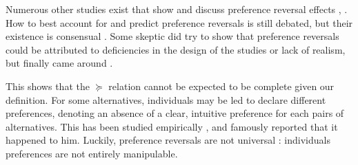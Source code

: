 \documentclass[french, english]{llncs}
\begin{document}
	
	Numerous other studies exist that show and discuss preference reversal effects \citep[Ch. 2]{deparis_etude_2012}, \citep{lichtenstein_construction_2006, tversky_causes_1990, kahneman_judgement_1981, kahneman_choices_2000}. How to best account for and predict preference reversals is still debated, but their existence is consensual \citep{wakker_prospect_2010, birnbaum_empirical_2017}. Some skeptic did try to show that preference reversals could be attributed to deficiencies in the design of the studies or lack of realism, but finally came around \citet{slovic_preference_1983}.
		
	This shows that the $\succeq$ relation cannot be expected to be complete given our definition. For some alternatives, individuals may be led to declare different preferences, denoting an absence of a clear, intuitive preference for each pairs of alternatives. This has been studied empirically \citep{slovic_who_1974, maccrimmon_utility_1979, lichtenstein_reversals_2006}, and \citet[pp. 101 – 103]{savage_foundations_1972} famously reported that it happened to him. Luckily, preference reversals are not universal \citep[p. xvi]{lichtenstein_construction_2006}: individuals preferences are not entirely manipulable.
	
\end{document}
